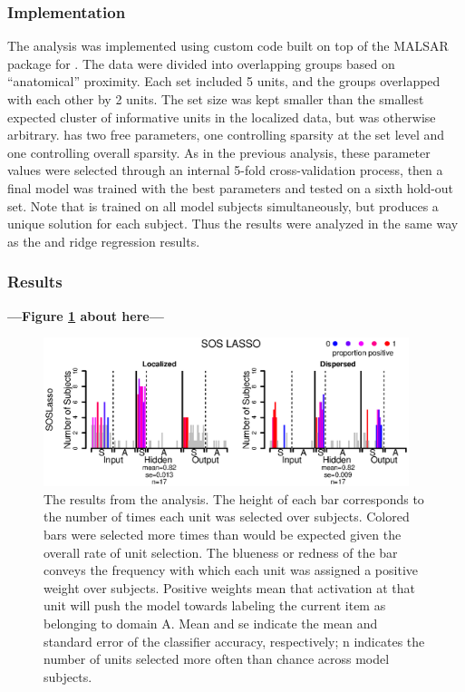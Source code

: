 \subsubsection{Implementation} 
The {\soslasso} analysis was implemented using custom code built on top of the MALSAR package \cite{malsar} for {\matlab}. The data were divided into overlapping groups based on ``anatomical'' proximity. Each set included 5 units, and the groups overlapped with each other by 2 units. The set size was kept smaller than the smallest expected cluster of informative units in the localized data, but was otherwise arbitrary. {\soslasso} has two free parameters, one controlling sparsity at the set level and one controlling overall sparsity. As in the previous analysis, these parameter values  were selected through an internal 5-fold cross-validation process, then a final model was trained with the best parameters and tested on a sixth hold-out set. Note that {\soslasso} is trained on all model subjects simultaneously, but produces a unique solution for each subject. Thus the results were analyzed in the same way as the {\lasso} and ridge regression results.

\subsubsection{Results}

\begin{center}
\textbf{---Figure \ref{fig.sos} about here---}
\end{center}

\begin{figure}
\centering
\includegraphics[width=0.95\textwidth]{figures/figure9.eps}
\caption{The results from the {\soslasso} analysis. The height of each bar corresponds to the number of times each unit was selected over subjects. Colored bars were selected more times than would be expected given the overall rate of unit selection. The blueness or redness of the bar conveys the frequency with which each unit was assigned a positive weight over subjects. Positive weights mean that activation at that unit will push the model towards labeling the current item as belonging to domain A. Mean and se indicate the mean and standard error of the classifier accuracy, respectively; n indicates the number of units selected more often than chance across model subjects.}
\label{fig.sos} 
\end{figure}

